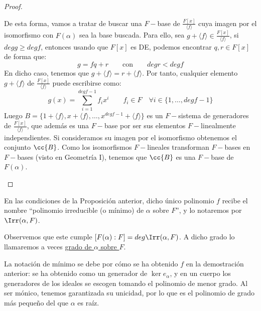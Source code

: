 \begin{prop}
\begin{proof}
\begin{itemize}
                De esta forma, vamos a tratar de buscar una $F-$base de $\frac{F[x]}{\langle f \rangle }$ cuya imagen por el isomorfismo con $F(\alpha)$ sea la base buscada. Para ello, sea $g+\langle f \rangle \in \frac{F[x]}{\langle f \rangle }$, si $deg g \geq deg f$, entonces usando que $F[x]$ es DE, podemos encontrar $q,r\in F[x]$ de forma que:
                \begin{equation*}
                    g = fq + r \qquad \text{con} \qquad degr < degf
                \end{equation*}
                En dicho caso, tenemos que $g+\langle f \rangle = r+ \langle f \rangle $. Por tanto, cualquier elemento $g+\langle f \rangle $ de $\frac{F[x]}{\langle f \rangle }$ puede escribirse como:
                \begin{equation*}
                    g(x) = \sum_{i=1}^{degf-1} f_ix^i \qquad f_i \in F \quad \forall i \in \{1,\ldots,degf-1\}
                \end{equation*}
                Luego $B=\{1+\langle f \rangle,x+\langle f \rangle, \ldots, x^{degf-1}+\langle f \rangle  \}$ es un $F-$sistema de generadores de $\frac{F[x]}{\langle f \rangle }$, que además es una $F-$base por ser sus elementos $F-$linealmente independientes. Si consideramos su imagen por el isomorfismo obtenemos el conjunto $\cc{B}$. Como los isomorfismos $F-$lineales transforman $F-$bases en $F-$bases (visto en Geometría I), tenemos que $\cc{B}$ es una $F-$base de $F(\alpha)$.
        \end{itemize}
    \end{proof}
\end{prop}

\begin{definicion}
    En las condiciones de la Proposición anterior, dicho único polinomio $f$ recibe el nombre ``polinomio irreducible (o mínimo) de $\alpha$ sobre $F$'', y lo notaremos por $\Irr(\alpha,F)$.

    \noindent
    Observemos que este cumple $[F(\alpha):F] = deg \Irr(\alpha,F)$. A dicho grado lo llamaremos a veces \underline{grado de $\alpha$ sobre $F$}.
\end{definicion}

\noindent
La notación de mínimo se debe por cómo se ha obtenido $f$ en la demostración anterior: se ha obtenido como un generador de $\ker e_\alpha$, y en un cuerpo los generadores de los ideales se escogen tomando el polinomio de menor grado. Al ser mónico, tenemos garantizada su unicidad, por lo que es el polinomio de grado más pequeño del que $\alpha$ es raíz.

